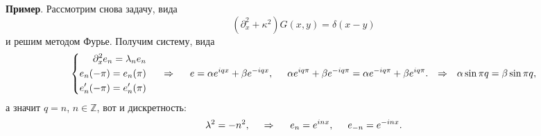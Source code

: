 \textbf{Пример}. Рассмотрим снова задачу, вида
\begin{equation*}
    (\partial_x^2 + \kappa^2) G(x, y) = \delta(x-y)
\end{equation*}
и решим методом Фурье. Получим систему, вида
\begin{equation*}
    \left\{\begin{aligned}
        \partial_x^2 e_n = \lambda_n e_n \\
        e_n (-\pi) = e_n (\pi) \\ 
        e_n'(-\pi) = e_n'(\pi) \\
    \end{aligned}\right.
    \hspace{0.5cm} \Rightarrow \hspace{0.5cm}
    e = \alpha e^{i q x} + \beta e^{- i q x}, 
    \hspace{5 mm} 
    \alpha e^{i q \pi} + \beta e^{- i q \pi} = \alpha e^{- i q \pi} + \beta e^{i q \pi}.
    \hspace{0.25cm} \Rightarrow \hspace{0.25cm}
    \alpha \sin \pi q = \beta \sin \pi q,
\end{equation*}
а значит $q = n$, $n \in \mathbb{Z}$, вот и дискретность:
\begin{equation*}
    \lambda^2 = - n^2,
    \hspace{0.5cm} \Rightarrow \hspace{0.5cm}
    e_n = e^{i n x}, \hspace{5 mm} 
    e_{-n} = e^{- i nx}.
\end{equation*} 















